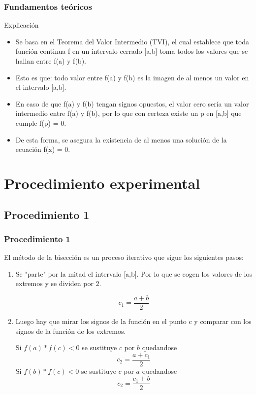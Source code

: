 \documentclass{beamer}
\begin{document}
\begin{frame}

\frametitle{Fundamentos teóricos}

\begin{block}{Explicación}
  \begin{itemize}
  \item
    Se basa en el Teorema del Valor Intermedio (TVI), el cual establece que toda función continua f en un intervalo cerrado [a,b] toma todos los valores que se hallan entre f(a) y f(b). 
  \pause

  \item
    Esto es que: todo valor entre f(a) y f(b) es la imagen de al menos un valor en el intervalo [a,b]. 
  \pause

  \item
    En caso de que f(a) y f(b) tengan signos opuestos, el valor cero sería un valor intermedio entre f(a) y f(b), por lo que con certeza existe un p en [a,b] que cumple f(p) = 0. 
  \pause

  \item
    De esta forma, se asegura la existencia de al menos una solución de la ecuación f(x) = 0.
  \end{itemize}
\end{block}

\end{frame}

\section{Procedimiento experimental}

\subsection{Procedimiento 1}
\begin{frame}
\frametitle{Procedimiento 1}
El método de la bisección es un proceso iterativo que sigue los siguientes pasos:
\begin{enumerate}
 \item
  Se "parte" por la mitad el intervalo [a,b]. Por lo que se cogen los valores de los extremos y se dividen por $2$.
  \begin{center}
   $$ c_1=\frac{a+b}{2} $$
  \end{center}
 \pause

 \item
  Luego hay que mirar los signos de la función en el punto c y comparar con los signos de la función de los extremos.
   \begin{enumerate}
    \Item
     Si $f(a)*f(c)<0$ se sustituye $c$ por $b$ quedandose $$c_2=\frac{a+c_1}{2}$$
    \Item
     Si $f(b)*f(c)<0$ se sustituye $c$ por $a$ quedandose $$c_2=\frac{c_1+b}{2}$$
   \end{enumerate}

 
\end{enumerate}
\end{frame}
\end{document}
